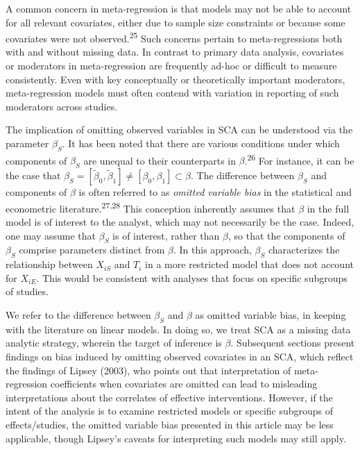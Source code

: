\documentclass[
]{article}
\begin{document}
A common concern in meta-regression is that models may not be able to account for all relevant covariates, either due to sample size constraints or because some covariates were not observed.\textsuperscript{25}
Such concerns pertain to meta-regressions both with and without missing data.
In contrast to primary data analysis, covariates or moderators in meta-regression are frequently ad-hoc or difficult to measure consistently.
Even with key conceptually or theoretically important moderators, meta-regression models must often contend with variation in reporting of such moderators across studies.

The implication of omitting observed variables in SCA can be understood via the parameter \(\beta_S\).
It has been noted that there are various conditions under which components of \(\beta_S\) are unequal to their counterparts in \(\beta\).\textsuperscript{26}
For instance, it can be the case that \(\beta_S = [\tilde{\beta}_0, \tilde{\beta}_1] \neq [\beta_0, \beta_1] \subset \beta\).
The difference between \(\beta_S\) and components of \(\beta\) is often referred to as \emph{omitted variable bias} in the statistical and econometric literature.\textsuperscript{27,28}
This conception inherently assumes that \(\beta\) in the full model is of interest to the analyst, which may not necessarily be the case.
Indeed, one may assume that \(\beta_S\) is of interest, rather than \(\beta\), so that the components of \(\beta_S\) comprise parameters distinct from \(\beta\).
In this approach, \(\beta_S\) characterizes the relationship between \(X_{iS}\) and \(T_i\) in a more restricted model that does not account for \(X_{iE}\).
This would be consistent with analyses that focus on specific subgroups of studies.

We refer to the difference between \(\beta_S\) and \(\beta\) as omitted variable bias, in keeping with the literature on linear models.
In doing so, we treat SCA as a missing data analytic strategy, wherein the target of inference is \(\beta\).
Subsequent sections present findings on bias induced by omitting observed covariates in an SCA, which reflect the findings of Lipsey (2003), who points out that interpretation of meta-regression coefficients when covariates are omitted can lead to misleading interpretations about the correlates of effective interventions.
However, if the intent of the analysis is to examine restricted models or specific subgroups of effects/studies, the omitted variable bias presented in this article may be less applicable, though Lipsey's caveats for interpreting such models may still apply.
\end{document}
